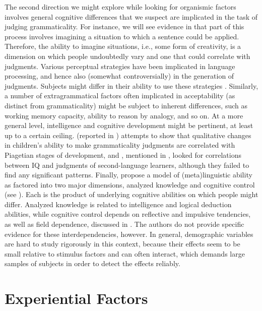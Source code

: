 The second direction we might explore while looking for organismic factors involves general cognitive differences that we suspect are implicated in the task of judging grammaticality. For instance, we will see evidence in  that part of this process involves imagining a situation to which a sentence could be applied. Therefore, the ability to imagine situations, i.e., some form of creativity, is a dimension on which people undoubtedly vary and one that could correlate with judgments. Various perceptual strategies have been implicated in language processing, and hence also (somewhat controversially) in the generation of judgments. Subjects might differ in their ability to use these strategies \citep{Botha1973}. Similarly, a number of extragrammatical factors often implicated in acceptability (as distinct from grammaticality) might be subject to inherent differences, such as working memory capacity, ability to reason by analogy, and so on. At a more general level, intelligence and cognitive development might be pertinent, at least up to a certain ceiling. \citet{Hakes1980} (reported in ) attempts to show that qualitative changes in children's ability to make grammaticality judgments are correlated with Piagetian stages of development, and \citet{MasnyEtAl1985}, mentioned in , looked for correlations between IQ and judgments
of second-language learners, although they failed to find any significant patterns. Finally, \citet{BialystokEtAl1985} propose a model of (meta)linguistic ability as factored into two major dimensions, analyzed knowledge and cognitive control (see ). Each is the product of underlying cognitive abilities on which people might differ. Analyzed knowledge is related to intelligence and logical deduction abilities, while cognitive control depends on reflective and impulsive tendencies, as well as field dependence, discussed in . The authors do not provide specific evidence for these interdependencies, however. In general, demographic variables are hard to study rigorously in this context, because their effects seem to be small relative to stimulus factors and can often interact, which demands large samples of subjects in order to detect the effects reliably.

\section{Experiential Factors}\label{sec:4.4}

